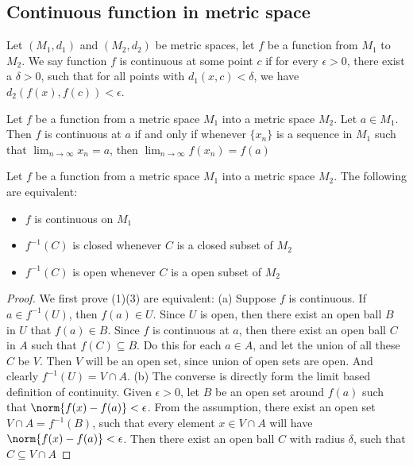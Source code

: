 \begin{refsection}
\subsection{Continuous function in metric space}
\begin{definition}
	\cite[136]{johnsonbaugh2010foundations}
	Let $(M_1,d_1)$ and $(M_2,d_2)$ be metric spaces, let $f$ be a function from $M_1$ to $M_2$. We say function $f$ is continuous at some point $c$ if for every $\epsilon >0$, there exist a $\delta >0$, such that for all points with $d_1(x,c)<\delta$, we have $d_2(f(x),f(c)) < \epsilon$. \cite{johnsonbaugh2010foundations}
\end{definition}

\begin{definition}
	\cite[136]{johnsonbaugh2010foundations}
	Let $f$ be a function from a metric space $M_1$ into a metric space $M_2$. Let $a\in M_1$. Then $f$ is continuous at $a$ if and only if whenever $\{x_n\}$ is a sequence in $M_1$ such that $\lim_{n\rightarrow \infty} x_n = a$, then $\lim_{n\rightarrow \infty} f(x_n) = f(a)$
\end{definition}

\begin{theorem}\label{ch:calculus:th:continuitypreserveTopology}
	\cite[139]{johnsonbaugh2010foundations} Let $f$ be a function from a metric space $M_1$ into a metric space $M_2$. The following are equivalent:
	\begin{itemize}
		\item $f$ is continuous on $M_1$
		\item $f^{-1}(C)$ is closed whenever $C$ is a closed subset of $M_2$
		\item $f^{-1}(C)$ is open whenever $C$ is a open subset of $M_2$
	\end{itemize}
\end{theorem}
\begin{proof}
	We first prove (1)(3) are equivalent: (a) Suppose $f$ is continuous. If $a\in f^{-1}(U)$, then $f(a) \in U$. Since $U$ is open, then there exist an open ball $B$ in $U$ that $f(a)\in B$. Since $f$ is continuous at $a$, then there exist an open ball $C$ in $A$ such that $f(C) \subseteq B$. Do this for each $a\in A$, and let the union of all these $C$ be $V$. Then $V$ will be an open set, since union of open sets are open. And clearly $f^{-1}(U) = V\cap A$. (b) The converse is directly form the limit based definition of continuity. Given $\epsilon > 0$, let $B$ be an open set around $f(a)$ such that $\norm{f(x)-f(a)} < \epsilon$. From the assumption, there exist an open set $V\cap A = f^{-1}(B)$, such that every element $x\in V\cap A$ will have $\norm{f(x)-f(a)} < \epsilon$. Then there exist an open ball $C$ with radius $\delta$, such that $C\subseteq V\cap A$	
\end{proof}







\end{refsection}
